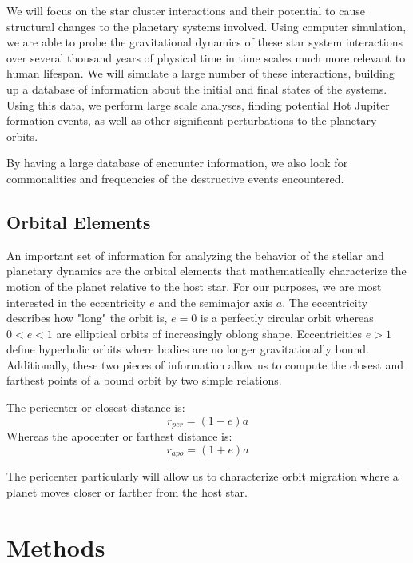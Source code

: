 \documentclass[12pt]{article}
\begin{document}
We will focus on the star cluster interactions and their potential to 
cause structural changes to the planetary systems involved. Using computer simulation,
we are able to probe the gravitational dynamics of these star system 
interactions over several thousand years of physical time 
in time scales much more relevant to human lifespan. We will simulate
a large number of these interactions, building up a database of information about
the initial and final states of the systems. Using this data, we perform large
scale analyses, finding potential Hot Jupiter formation events, as well as other
significant perturbations to the planetary orbits.

By having a large database of encounter information, we also look for commonalities
and frequencies of the destructive events encountered. 


\subsection{Orbital Elements}

    An important set of information for analyzing the behavior of the stellar and
    planetary dynamics are the orbital elements that mathematically 
    characterize the motion of the planet relative to the host star. 
    For our purposes, we are most interested in the eccentricity $e$ and the
    semimajor axis $a$. The eccentricity describes how "long" the orbit is, $e=0$
    is a perfectly circular orbit whereas $0<e<1$ are elliptical orbits of increasingly
    oblong shape. Eccentricities $e>1$ define hyperbolic orbits where bodies are no longer
    gravitationally bound. Additionally, these two pieces of information allow us to 
    compute the closest and farthest points of a bound orbit by two simple relations.

    The pericenter or closest distance is:
    \begin{equation}
        r_{per} = (1 - e) a
    \end{equation}
    Whereas the apocenter or farthest distance is:
    \begin{equation}
        r_{apo} = (1 + e) a
    \end{equation}

    The pericenter particularly will allow us to characterize orbit migration where a
    planet moves closer or farther from the host star.

\section{Methods}
\end{document}
